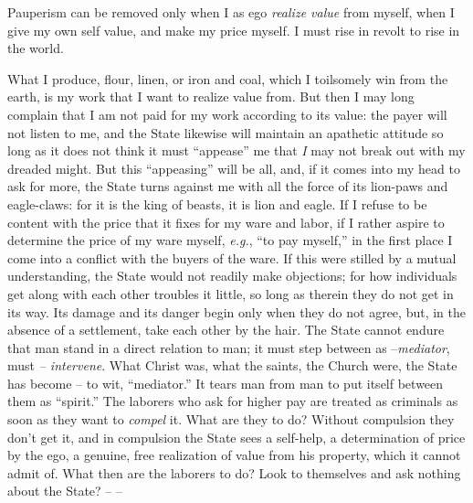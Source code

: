 Pauperism can be removed only when I as ego \textit{realize value} from 
myself, when I give my own self value, and make my price myself. I must rise 
in revolt to rise in the world.

What I produce, flour, linen, or iron and coal, which I toilsomely win from 
the earth, is my work that I want to realize value from. But then I may long 
complain that I am not paid for my work according to its value: the payer will 
not listen to me, and the State likewise will maintain an apathetic attitude 
so long as it does not think it must ``appease'' me that \textit{I} may not 
break out with my dreaded might. But this ``appeasing'' will be all, and, if 
it comes into my head to ask for more, the State turns against me with all the 
force of its lion-paws and eagle-claws: for it is the king of beasts, it is 
lion and eagle. If I refuse to be content with the price that it fixes for my 
ware and labor, if I rather aspire to determine the price of my ware myself, 
\textit{e.g.}, ``to pay myself,'' in the first place I come into a conflict 
with the buyers of the ware. If this were stilled by a mutual understanding, 
the State would not readily make objections; for how individuals get along 
with each other troubles it little, so long as therein they do not get in its 
way. Its damage and its danger begin only when they do not agree, but, in the 
absence of a settlement, take each other by the hair. The State cannot endure 
that man stand in a direct relation to man; it must step between as 
--\textit{mediator}, must \textit{-- intervene}. What Christ was, what the 
saints, the Church were, the State has become -- to wit, ``mediator.'' It 
tears man from man to put itself between them as ``spirit.'' The laborers 
who ask for higher pay are treated as criminals as soon as they want to 
\textit{compel} it. What are they to do? Without compulsion they don't get it, 
and in compulsion the State sees a self-help, a determination of price by the 
ego, a genuine, free realization of value from his property, which it cannot 
admit of. What then are the laborers to do? Look to themselves and ask nothing 
about the State? -- --

